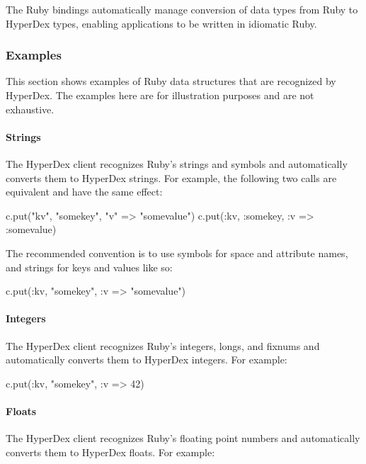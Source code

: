 The Ruby bindings automatically manage conversion of data types from Ruby to
HyperDex types, enabling applications to be written in idiomatic Ruby.

\subsubsection{Examples}
\label{sec:api:ruby:examples}

This section shows examples of Ruby data structures that are recognized by
HyperDex.  The examples here are for illustration purposes and are not
exhaustive.

\paragraph{Strings}

The HyperDex client recognizes Ruby's strings and symbols and automatically
converts them to HyperDex strings.  For example, the following two calls are
equivalent and have the same effect:

\begin{rubycode}
c.put("kv", "somekey", {"v" => "somevalue"})
c.put(:kv, :somekey, {:v => :somevalue})
\end{rubycode}

The recommended convention is to use symbols for space and attribute names, and
strings for keys and values like so:

\begin{rubycode}
c.put(:kv, "somekey", {:v => "somevalue"})
\end{rubycode}

\paragraph{Integers}

The HyperDex client recognizes Ruby's integers, longs, and fixnums and
automatically converts them to HyperDex integers.  For example:

\begin{rubycode}
c.put(:kv, "somekey", {:v => 42})
\end{rubycode}

\paragraph{Floats}

The HyperDex client recognizes Ruby's floating point numbers and automatically
converts them to HyperDex floats.  For example:

